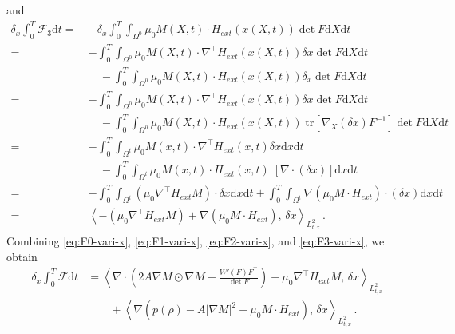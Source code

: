 \documentclass[reqno,11pt]{amsart}
\numberwithin{equation}{section}
\def\d{\mathrm{d}}
\def\no{\nonumber}
\def\tr{\mathrm{tr}}
\newcommand{\skpa}[2]{\left\langle #1,\, #2 \right\rangle}
\begin{document}
and 
  \begin{align}\label{eq:F3-vari-x}
    \delta_x \int_0^T \mathcal{F}_3 \d t 
    =\ & - \delta_x \int_0^T \int_{\Omega^0} \mu_0 M(X,t) \cdot H_{ext}(x(X,t)) \det F \d X \d t \\\no
    =\ & - \int_0^T \int_{\Omega^0} \mu_0 M(X,t) \cdot \nabla^\top H_{ext}(x(X,t)) \delta x \det F \d X \d t  \\[3pt] \no & \quad 
         - \int_0^T \int_{\Omega^0} \mu_0 M(X,t) \cdot H_{ext}(x(X,t)) \delta_x \det F \d X \d t \\\no
    =\ & - \int_0^T \int_{\Omega^0} \mu_0 M(X,t) \cdot \nabla^\top H_{ext}(x(X,t)) \delta x \det F \d X \d t  \\[3pt] \no & \quad 
         - \int_0^T \int_{\Omega^0} \mu_0 M(X,t) \cdot H_{ext}(x(X,t)) \;\tr \left[ \nabla_X (\delta x) F^{-1} \right] \det F \d X \d t \\\no 
    =\ & - \int_0^T \int_{\Omega^t} \mu_0 M(x,t) \cdot \nabla^\top H_{ext}(x,t) \delta x \d x \d t  
      \\[3pt] \no & \quad 
          - \int_0^T \int_{\Omega^t} \mu_0 M(x,t) \cdot H_{ext}(x,t) \; [\nabla \cdot (\delta x)] \d x \d t \\\no
    =\ & - \int_0^T \int_{\Omega^t} (\mu_0 \nabla^\top H_{ext} M) \cdot \delta x \d x \d t 
          + \int_0^T \int_{\Omega^t} \nabla \left( \mu_0 M \cdot H_{ext} \right) \cdot (\delta x) \d x \d t \\\no
    =\ & \skpa{- (\mu_0 \nabla^\top H_{ext} M) + \nabla \left( \mu_0 M \cdot H_{ext} \right) }{\delta x}_{L^2_{t,x}} \,. 
  \end{align}
Combining \eqref{eq:F0-vari-x}, \eqref{eq:F1-vari-x}, \eqref{eq:F2-vari-x}, and \eqref{eq:F3-vari-x}, we obtain
  \begin{align}\label{eq:F-vari-x}
    \delta_x \int_0^T \mathcal{F} \d t 
    & = \skpa{\nabla \cdot \left( 2 A \nabla M \odot \nabla M - \tfrac{W'(F)F^\top}{\det F} \right) - \mu_0 \nabla^\top H_{ext} M }{\delta x}_{L^2_{t,x}} \\[3pt] \no & \qquad 
        + \skpa{\nabla \left( p(\rho) - A |\nabla M|^2 + \mu_0 M \cdot H_{ext} \right) }{\delta x}_{L^2_{t,x}} 
        \,.
  \end{align}
\end{document}
